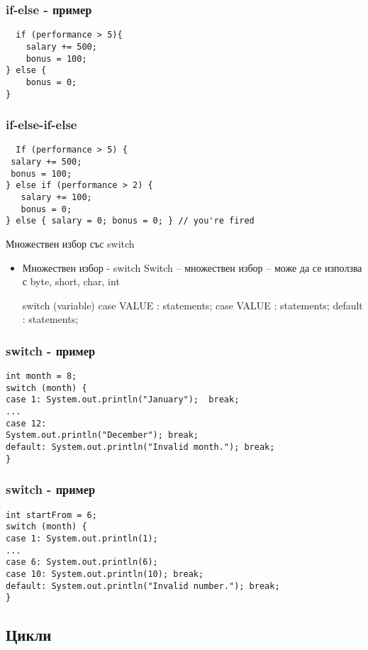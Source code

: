 \documentclass{beamer}
\begin{document}
\begin{frame}[fragile]
  \frametitle{if-else - пример}
\begin{lstlisting}
  if (performance > 5){
    salary += 500;
    bonus = 100;
} else {
    bonus = 0;
}
\end{lstlisting}
\end{frame}

\begin{frame}[fragile]
  \frametitle{if-else-if-else}
\begin{lstlisting}
  If (performance > 5) {
 salary += 500;
 bonus = 100;
} else if (performance > 2) {
   salary += 100;
   bonus = 0;
} else { salary = 0; bonus = 0; } // you're fired

\end{lstlisting}
\end{frame}

\begin{frame}{Множествен избор със switch}
  \begin{itemize}
  \item    Множествен избор - switch
    Switch – множествен избор – може да се
    използва с byte, short, char, int

    switch (variable) {
      case VALUE : statements;
      case VALUE : statements;
      default : statements;
    }

  \end{itemize}
\end{frame}

\begin{frame}[fragile]
  \frametitle{switch - пример}
\begin{lstlisting}
int month = 8;
switch (month) {
case 1: System.out.println("January");  break;
...
case 12:
System.out.println("December"); break;
default: System.out.println("Invalid month."); break;
}

\end{lstlisting}
\end{frame}

\begin{frame}[fragile]
  \frametitle{switch - пример}
\begin{lstlisting}
int startFrom = 6;
switch (month) {
case 1: System.out.println(1);
...
case 6: System.out.println(6);
case 10: System.out.println(10); break;
default: System.out.println("Invalid number."); break;
}
\end{lstlisting}
\end{frame}

\subsection{Цикли}
\end{document}

